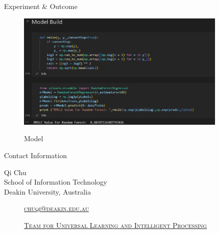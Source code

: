 \documentclass[
 size=14pt,
 paper=smartboard,  %
 mode=present, 		%
 display=slides, 	%
 style=tuliplab,  	%
 pauseslide,
 fleqn,leqno]{powerdot}
\begin{document}
\begin{slide}{Experiment \& Outcome}
\begin{figure}
  \centering
  \includegraphics[width=0.9\textwidth]{figures/model.eps}\\
  \caption{Model}\label{fig:Model}
\end{figure}
\end{slide}





\begin{wideslide}[toc=,bm=]{Contact Information}
\centering
{}
\twocolumn[
lcolwidth=0.35\linewidth,
rcolwidth=0.65\linewidth
]
{
}
{
Qi Chu\\
School of Information Technology\\
Deakin University, Australia
\begin{description}
 \item[\textcolor{orange}{\faEnvelope}] \href{mailto:chuqi@deakin.edu.au}
 {\textsc{\footnotesize{chuqi@deakin.edu.au}}}

 \item[\textcolor{orange}{\faHome}] \href{http://www.tulip.org.au}
 {\textsc{\footnotesize{Team for Universal Learning and Intelligent Processing}}}
\end{description}
}
\end{wideslide}
\end{document}
